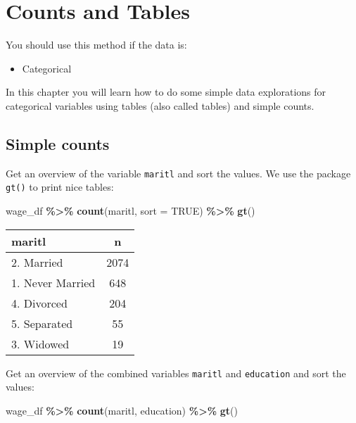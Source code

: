 \documentclass[
]{book}
\newenvironment{Shaded}{\begin{snugshade}}{\end{snugshade}}
\newcommand{\DataTypeTok}[1]{\textcolor[rgb]{0.13,0.29,0.53}{#1}}
\newcommand{\KeywordTok}[1]{\textcolor[rgb]{0.13,0.29,0.53}{\textbf{#1}}}
\newcommand{\NormalTok}[1]{#1}
\newcommand{\OperatorTok}[1]{\textcolor[rgb]{0.81,0.36,0.00}{\textbf{#1}}}
\newcommand{\OtherTok}[1]{\textcolor[rgb]{0.56,0.35,0.01}{#1}}
\newcommand{\StringTok}[1]{\textcolor[rgb]{0.31,0.60,0.02}{#1}}
\providecommand{\tightlist}{%
  \setlength{\itemsep}{0pt}\setlength{\parskip}{0pt}}
\begin{document}
\hypertarget{tables}{%
\chapter{Counts and Tables}\label{tables}}

You should use this method if the data is:

\begin{itemize}
\tightlist
\item
  Categorical
\end{itemize}

In this chapter you will learn how to do some simple data explorations for categorical variables using tables (also called tables) and simple counts.

\hypertarget{simple-counts}{%
\section{Simple counts}\label{simple-counts}}

Get an overview of the variable \texttt{maritl} and sort the values. We use the package \texttt{gt()} to print nice tables:

\begin{Shaded}
\begin{Highlighting}[]
\NormalTok{wage\_df }\OperatorTok{\%\textgreater{}\%}\StringTok{ }
\StringTok{  }\KeywordTok{count}\NormalTok{(maritl,}
  \DataTypeTok{sort =} \OtherTok{TRUE}\NormalTok{) }\OperatorTok{\%\textgreater{}\%}\StringTok{ }
\StringTok{  }\KeywordTok{gt}\NormalTok{()}
\end{Highlighting}
\end{Shaded}

\captionsetup[table]{labelformat=empty,skip=1pt}
\begin{longtable}{lc}
\toprule
maritl & n \\ 
\midrule
2. Married & 2074 \\ 
1. Never Married & 648 \\ 
4. Divorced & 204 \\ 
5. Separated & 55 \\ 
3. Widowed & 19 \\ 
\bottomrule
\end{longtable}

Get an overview of the combined variables \texttt{maritl} and \texttt{education} and sort the values:

\begin{Shaded}
\begin{Highlighting}[]
\NormalTok{wage\_df }\OperatorTok{\%\textgreater{}\%}\StringTok{ }
\StringTok{  }\KeywordTok{count}\NormalTok{(maritl, education) }\OperatorTok{\%\textgreater{}\%}\StringTok{ }
\StringTok{  }\KeywordTok{gt}\NormalTok{()}
\end{Highlighting}
\end{Shaded}
\end{document}
